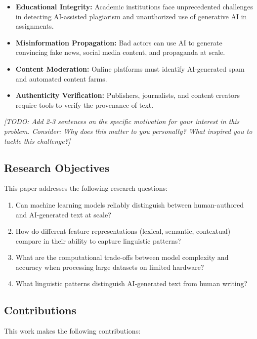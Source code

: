 \documentclass[12pt, a4paper]{article}
\begin{document}
\begin{itemize}
    \item \textbf{Educational Integrity:} Academic institutions face unprecedented challenges in detecting AI-assisted plagiarism and unauthorized use of generative AI in assignments.
    \item \textbf{Misinformation Propagation:} Bad actors can use AI to generate convincing fake news, social media content, and propaganda at scale.
    \item \textbf{Content Moderation:} Online platforms must identify AI-generated spam and automated content farms.
    \item \textbf{Authenticity Verification:} Publishers, journalists, and content creators require tools to verify the provenance of text.
\end{itemize}

\textit{[TODO: Add 2-3 sentences on the specific motivation for \textit{your} interest in this problem. Consider: Why does this matter to you personally? What inspired you to tackle this challenge?]}

\subsection{Research Objectives}

This paper addresses the following research questions:

\begin{enumerate}
    \item Can machine learning models reliably distinguish between human-authored and AI-generated text at scale?
    \item How do different feature representations (lexical, semantic, contextual) compare in their ability to capture linguistic patterns?
    \item What are the computational trade-offs between model complexity and accuracy when processing large datasets on limited hardware?
    \item What linguistic patterns distinguish AI-generated text from human writing?
\end{enumerate}

\subsection{Contributions}

This work makes the following contributions:
\end{document}
